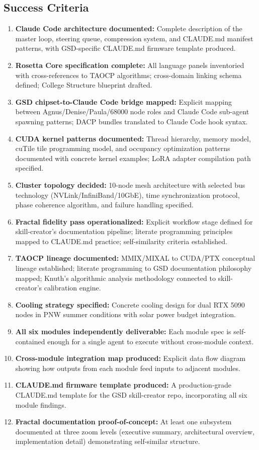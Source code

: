 \documentclass[11pt,letterpaper]{article}
\begin{document}
\subsection{Success Criteria}

\begin{enumerate}
  \item \textbf{Claude Code architecture documented:} Complete description of the master loop, steering queue, compression system, and CLAUDE.md manifest patterns, with GSD-specific CLAUDE.md firmware template produced.
  \item \textbf{Rosetta Core specification complete:} All language panels inventoried with cross-references to TAOCP algorithms; cross-domain linking schema defined; College Structure blueprint drafted.
  \item \textbf{GSD chipset-to-Claude Code bridge mapped:} Explicit mapping between Agnus/Denise/Paula/68000 node roles and Claude Code sub-agent spawning patterns; DACP bundles translated to Claude Code hook syntax.
  \item \textbf{CUDA kernel patterns documented:} Thread hierarchy, memory model, cuTile tile programming model, and occupancy optimization patterns documented with concrete kernel examples; LoRA adapter compilation path specified.
  \item \textbf{Cluster topology decided:} 10-node mesh architecture with selected bus technology (NVLink/InfiniBand/10GbE), time synchronization protocol, phase coherence algorithm, and failure handling specified.
  \item \textbf{Fractal fidelity pass operationalized:} Explicit workflow stage defined for skill-creator's documentation pipeline; literate programming principles mapped to CLAUDE.md practice; self-similarity criteria established.
  \item \textbf{TAOCP lineage documented:} MMIX/MIXAL to CUDA/PTX conceptual lineage established; literate programming to GSD documentation philosophy mapped; Knuth's algorithmic analysis methodology connected to skill-creator's calibration engine.
  \item \textbf{Cooling strategy specified:} Concrete cooling design for dual RTX 5090 nodes in PNW summer conditions with solar power budget integration.
  \item \textbf{All six modules independently deliverable:} Each module spec is self-contained enough for a single agent to execute without cross-module context.
  \item \textbf{Cross-module integration map produced:} Explicit data flow diagram showing how outputs from each module feed inputs to adjacent modules.
  \item \textbf{CLAUDE.md firmware template produced:} A production-grade CLAUDE.md template for the GSD skill-creator repo, incorporating all six module findings.
  \item \textbf{Fractal documentation proof-of-concept:} At least one subsystem documented at three zoom levels (executive summary, architectural overview, implementation detail) demonstrating self-similar structure.
\end{enumerate}
\end{document}
